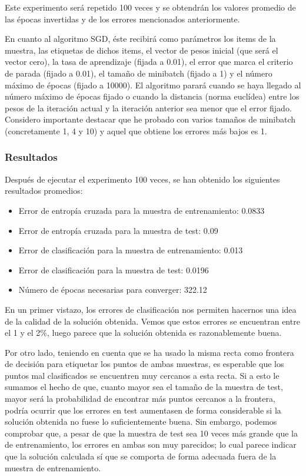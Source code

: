 \documentclass[10pt,a4paper]{article}
\begin{document}
Este experimento será repetido 100 veces y se obtendrán los valores promedio de las épocas invertidas y de los errores mencionados anteriormente.

En cuanto al algoritmo SGD, éste recibirá como parámetros los items de la muestra, las etiquetas de dichos items, el vector de pesos inicial (que será el vector cero), la tasa de aprendizaje (fijada a 0.01), el error que marca el criterio de parada (fijado a 0.01), el tamaño de minibatch (fijado a 1) y el número máximo de épocas (fijado a 10000). El algoritmo parará cuando se haya llegado al número máximo de épocas fijado o cuando la distancia (norma euclídea) entre los pesos de la iteración actual y la iteración anterior sea menor que el error fijado. Considero importante destacar que he probado con varios tamaños de minibatch (concretamente 1, 4 y 10) y aquel que obtiene los errores más bajos es 1.



\subsubsection{Resultados}

Después de ejecutar el experimento 100 veces, se han obtenido los siguientes resultados promedios:

\begin{itemize}
	\item Error de entropía cruzada para la muestra de entrenamiento: 0.0833
	\item Error de entropía cruzada para la muestra de test: 0.09
	\item Error de clasificación para la muestra de entrenamiento: 0.013
	\item Error de clasificación para la muestra de test: 0.0196
	\item Número de épocas necesarias para converger: 322.12
\end{itemize}

En un primer vistazo, los errores de clasificación nos permiten hacernos una idea de la calidad de la solución obtenida. Vemos que estos errores se encuentran entre el 1 y el 2\%, luego parece que la solución obtenida es razonablemente buena.

Por otro lado, teniendo en cuenta que se ha usado la misma recta como frontera de decisión para etiquetar los puntos de ambas muestras, es esperable que los puntos mal clasificados se encuentren muy cercanos a esta recta. Si a esto le sumamos el hecho de que, cuanto mayor sea el tamaño de la muestra de test, mayor será la probabilidad de encontrar más puntos cercanos a la frontera, podría ocurrir que los errores en test aumentasen de forma considerable si la solución obtenida no fuese lo suficientemente buena. Sin embargo, podemos comprobar que, a pesar de que la muestra de test sea 10 veces más grande que la de entrenamiento, los errores en ambas son muy parecidos; lo cual parece indicar que la solución calculada sí que se comporta de forma adecuada fuera de la muestra de entrenamiento.
\end{document}
